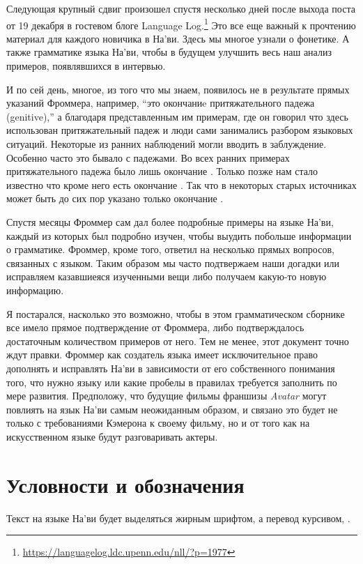Следующая крупный сдвиг произошел спустя несколько дней после
выхода поста от 19 декабря в гостевом блоге Language
Log.\footnote{\url{https://languagelog.ldc.upenn.edu/nll/?p=1977}}
Это все еще важный к прочтению материал для каждого новичика
в На'ви. Здесь мы многое узнали о фонетике. А
также грамматике языка На’ви, чтобы в будущем улучшить весь наш анализ
примеров, появлявшихся в интервью.

И по сей день, многое, из того что мы знаем, появилось не в результате прямых указа\-ний Фроммера, например, ``это окончаниe притяжательного
падежа (genitive),'' а благодаря пред\-став\-лен\-ным им примерам, где
он говорил что здесь использован притяжательный падеж и люди
сами занимались разбором языковых ситуаций. Некоторые из ранних на\-блю\-дений
могли вво\-дить в заблуждение. Особенно часто это бывало с
падежами. Во всех ранних примерах притяжа\-тель\-ного падежа
было лишь окончание . Только позже нам стало известно что кроме него есть окончание . Так что в некоторых старых источниках может быть до сих пор указано только окончание
.

Спустя месяцы Фроммер сам дал более подробные примеры на языке
На'ви, каждый из которых был подробно изучен, чтобы выудить побольше информации о грамматике. Фроммер, кроме того,
ответил на несколько прямых вопросов, связанных с языком. Таким образом мы часто подтвержаем наши догадки или исправляем казавшиеяся
изученными вещи либо получаем какую-то новую информацию.

Я постарался, насколько это возможно, чтобы в этом
грамматическом сборнике все имело прямое подтверждение от Фроммера,
либо подтверждалось достаточным коли\-че\-ством примеров от него. Тем не менее, этот документ точно ждут
правки. Фроммер как создатель языка имеет исключительное право
дополнять и исправлять На'ви в за\-ви\-си\-мос\-ти от его собственного понимания
того, что нужно языку или какие пробелы в правилах требуется
заполнить по мере развития.
Предположу, что будущие фильмы франшизы \textit{Avatar} могут
повлиять на язык На'ви самым неожиданным образом, и связано это
будет не только с требованиями Кэмерона к своему фильму, но и от того как на искусственном языке будут
разговаривать актеры.


\section{Условности и обозначения}

Текст на языке На'ви будет выделяться жирным шрифтом, а перевод
курсивом,  .

